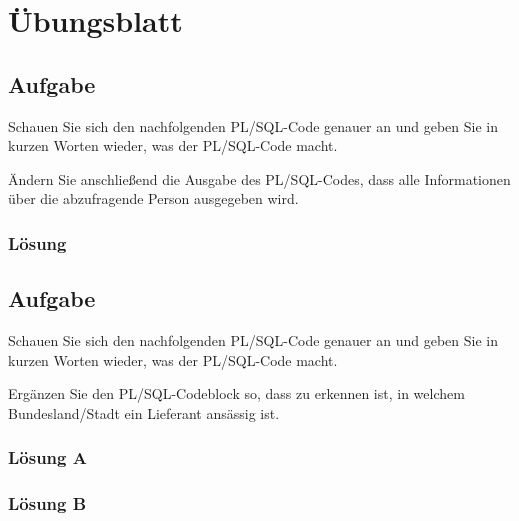 \section{Übungsblatt}
\label{sec:uebung_06}

\subsection{Aufgabe}
\label{sec:uebung_06.aufgabe_01}
Schauen Sie sich den nachfolgenden PL/SQL-Code genauer an und geben Sie in kurzen Worten wieder, was der PL/SQL-Code macht.

Ändern Sie anschließend die Ausgabe des PL/SQL-Codes, dass alle Informationen über die abzufragende Person ausgegeben wird.


\subsubsection*{Lösung}
\label{sec:uebung_06.aufgabe_01.loesung}

\subsection{Aufgabe}
\label{sec:uebung_06.aufgabe_02}
Schauen Sie sich den nachfolgenden PL/SQL-Code genauer an und geben Sie in kurzen Worten wieder, was der PL/SQL-Code macht.

Ergänzen Sie den PL/SQL-Codeblock so, dass zu erkennen ist, in welchem Bundesland/Stadt ein Lieferant ansässig ist.


\subsubsection*{Lösung A}
\label{sec:uebung_06.aufgabe_02.loesung.A}

\subsubsection*{Lösung B}
\label{sec:uebung_06.aufgabe_02.loesung.B}

